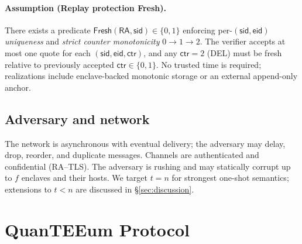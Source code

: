 \documentclass[runningheads,orivec]{llncs}
\newcommand{\prot}{\textsf{QuanTEEum}}
\begin{document}
\paragraph{Assumption (Replay protection \textsf{Fresh}).}
There exists a predicate $\textsf{Fresh}(\mathsf{RA},\mathsf{sid})\!\in\!\{0,1\}$ enforcing per-$(\mathsf{sid},\mathsf{eid})$ \emph{uniqueness} and \emph{strict counter monotonicity} $0\!\rightarrow\!1\!\rightarrow\!2$. The verifier accepts at most one quote for each $(\mathsf{sid},\mathsf{eid},\mathsf{ctr})$, and any $\mathsf{ctr}{=}2$ (DEL) must be fresh relative to previously accepted $\mathsf{ctr}\in\{0,1\}$. No trusted time is required; realizations include enclave-backed monotonic storage or an external append-only anchor.

\subsection{Adversary and network}
The network is asynchronous with eventual delivery; the adversary may delay, drop, reorder, and duplicate messages. Channels are authenticated and confidential (RA--TLS). The adversary is rushing and may statically corrupt up to $f$ enclaves and their hosts. We target $t{=}n$ for strongest one-shot semantics; extensions to $t<n$ are discussed in \S\ref{sec:discussion}.

\section{\prot{} Protocol}\label{sec:protocol}
\end{document}
